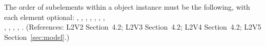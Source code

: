 The order of subelements within a \Model object instance must be the
following, with each element optional:
, ,
,
,
, ,
,\\
,
, , ,
.  (References: L2V2 Section~4.2; L2V3
Section~4.2; L2V4 Section~4.2; L2V5 Section~\ref{sec:model}.)
